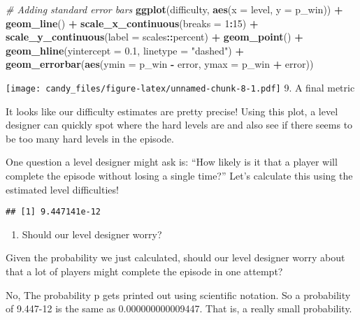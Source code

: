 \documentclass[
]{article}
\newenvironment{Shaded}{\begin{snugshade}}{\end{snugshade}}
\newcommand{\AttributeTok}[1]{\textcolor[rgb]{0.13,0.29,0.53}{#1}}
\newcommand{\CommentTok}[1]{\textcolor[rgb]{0.56,0.35,0.01}{\textit{#1}}}
\newcommand{\DecValTok}[1]{\textcolor[rgb]{0.00,0.00,0.81}{#1}}
\newcommand{\FloatTok}[1]{\textcolor[rgb]{0.00,0.00,0.81}{#1}}
\newcommand{\FunctionTok}[1]{\textcolor[rgb]{0.13,0.29,0.53}{\textbf{#1}}}
\newcommand{\NormalTok}[1]{#1}
\newcommand{\OtherTok}[1]{\textcolor[rgb]{0.56,0.35,0.01}{#1}}
\newcommand{\SpecialCharTok}[1]{\textcolor[rgb]{0.81,0.36,0.00}{\textbf{#1}}}
\newcommand{\StringTok}[1]{\textcolor[rgb]{0.31,0.60,0.02}{#1}}
\providecommand{\tightlist}{%
  \setlength{\itemsep}{0pt}\setlength{\parskip}{0pt}}
\begin{document}
\begin{Shaded}
\begin{Highlighting}[]
\CommentTok{\# Adding standard error bars}
\FunctionTok{ggplot}\NormalTok{(difficulty, }\FunctionTok{aes}\NormalTok{(}\AttributeTok{x =}\NormalTok{ level, }\AttributeTok{y =}\NormalTok{ p\_win)) }\SpecialCharTok{+}
\FunctionTok{geom\_line}\NormalTok{() }\SpecialCharTok{+}
\FunctionTok{scale\_x\_continuous}\NormalTok{(}\AttributeTok{breaks =} \DecValTok{1}\SpecialCharTok{:}\DecValTok{15}\NormalTok{) }\SpecialCharTok{+}
\FunctionTok{scale\_y\_continuous}\NormalTok{(}\AttributeTok{label =}\NormalTok{ scales}\SpecialCharTok{::}\NormalTok{percent) }\SpecialCharTok{+}
\FunctionTok{geom\_point}\NormalTok{() }\SpecialCharTok{+}
\FunctionTok{geom\_hline}\NormalTok{(}\AttributeTok{yintercept =} \FloatTok{0.1}\NormalTok{, }\AttributeTok{linetype =} \StringTok{"dashed"}\NormalTok{) }\SpecialCharTok{+}
\FunctionTok{geom\_errorbar}\NormalTok{(}\FunctionTok{aes}\NormalTok{(}\AttributeTok{ymin =}\NormalTok{ p\_win }\SpecialCharTok{{-}}\NormalTok{ error, }\AttributeTok{ymax =}\NormalTok{ p\_win }\SpecialCharTok{+}\NormalTok{ error))}
\end{Highlighting}
\end{Shaded}

\texttt{[image: candy\_files/figure-latex/unnamed-chunk-8-1.pdf]} 9. A
final metric

It looks like our difficulty estimates are pretty precise! Using this
plot, a level designer can quickly spot where the hard levels are and
also see if there seems to be too many hard levels in the episode.

One question a level designer might ask is: ``How likely is it that a
player will complete the episode without losing a single time?'' Let's
calculate this using the estimated level difficulties!

\begin{Shaded}
\end{Shaded}

\begin{verbatim}
## [1] 9.447141e-12
\end{verbatim}

\begin{enumerate}
\def\labelenumi{\arabic{enumi}.}
\setcounter{enumi}{9}
\tightlist
\item
  Should our level designer worry?
\end{enumerate}

Given the probability we just calculated, should our level designer
worry about that a lot of players might complete the episode in one
attempt?

No, The probability p gets printed out using scientific notation. So a
probability of 9.447-12 is the same as 0.000000000009447. That is, a
really small probability.
\end{document}
